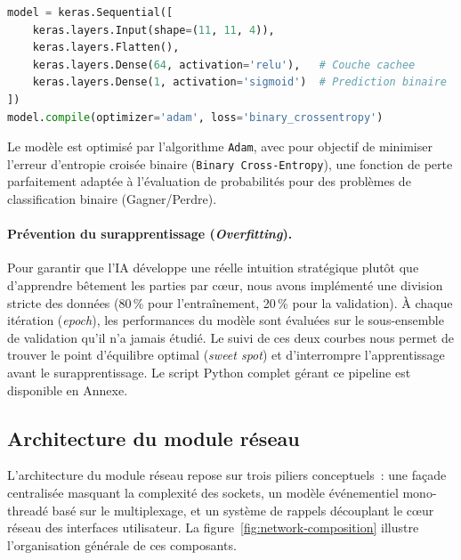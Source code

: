 \documentclass[a4paper]{article}
\begin{document}
\begin{lstlisting}[language=Python, caption=Architecture du Perceptron Multicouche (Keras)]
model = keras.Sequential([
    keras.layers.Input(shape=(11, 11, 4)),
    keras.layers.Flatten(),
    keras.layers.Dense(64, activation='relu'),   # Couche cachee
    keras.layers.Dense(1, activation='sigmoid')  # Prediction binaire
])
model.compile(optimizer='adam', loss='binary_crossentropy')
\end{lstlisting}

Le modèle est optimisé par l'algorithme \texttt{Adam}, avec pour objectif de minimiser l'erreur d'entropie croisée binaire (\texttt{Binary Cross-Entropy}), une fonction de perte parfaitement adaptée à l'évaluation de probabilités pour des problèmes de classification binaire (Gagner/Perdre).

\paragraph{Prévention du surapprentissage (\textit{Overfitting}).}
Pour garantir que l'IA développe une réelle intuition stratégique plutôt que d'apprendre bêtement les parties par cœur, nous avons implémenté une division stricte des données (80\,\% pour l'entraînement, 20\,\% pour la validation). À chaque itération (\textit{epoch}), les performances du modèle sont évaluées sur le sous-ensemble de validation qu'il n'a jamais étudié. Le suivi de ces deux courbes nous permet de trouver le point d'équilibre optimal (\textit{sweet spot}) et d'interrompre l'apprentissage avant le surapprentissage. Le script Python complet gérant ce pipeline est disponible en Annexe.

 \newpage
\subsection{Architecture du module réseau}
\label{sec:network-arch}
 
L'architecture du module réseau repose sur trois piliers conceptuels~: une
façade centralisée masquant la complexité des sockets, un modèle événementiel
mono-threadé basé sur le multiplexage, et un système de rappels découplant
le cœur réseau des interfaces utilisateur. La figure~\ref{fig:network-composition}
illustre l'organisation générale de ces composants.
 
\end{document}
